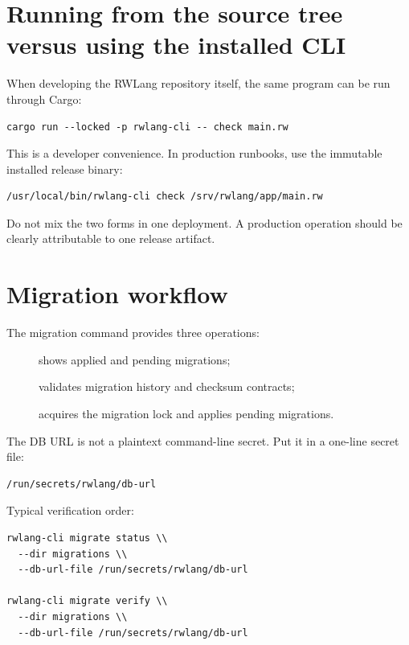 \section{Running from the source tree versus using the installed CLI}

When developing the RWLang repository itself, the same program can be run through Cargo:

\begin{lstlisting}
cargo run --locked -p rwlang-cli -- check main.rw
\end{lstlisting}

This is a developer convenience. In production runbooks, use the immutable installed release binary:

\begin{lstlisting}
/usr/local/bin/rwlang-cli check /srv/rwlang/app/main.rw
\end{lstlisting}

Do not mix the two forms in one deployment. A production operation should be clearly attributable to one release artifact.

\section{Migration workflow}

The migration command provides three operations:

\begin{description}
  \item[] shows applied and pending migrations;
  \item[] validates migration history and checksum contracts;
  \item[] acquires the migration lock and applies pending migrations.
\end{description}

The DB URL is not a plaintext command-line secret. Put it in a one-line secret file:

\begin{lstlisting}
/run/secrets/rwlang/db-url
\end{lstlisting}

Typical verification order:

\begin{lstlisting}
rwlang-cli migrate status \\
  --dir migrations \\
  --db-url-file /run/secrets/rwlang/db-url

rwlang-cli migrate verify \\
  --dir migrations \\
  --db-url-file /run/secrets/rwlang/db-url
\end{lstlisting}

